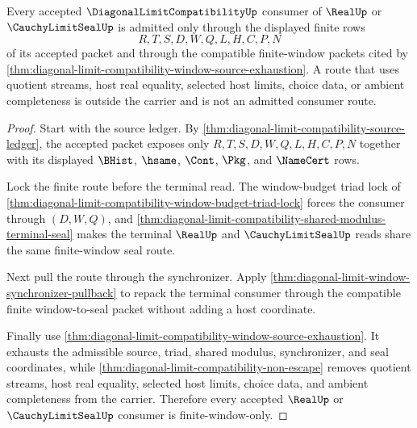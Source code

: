 \begin{theorem}
\label{thm:diagonal-limit-compatibility-finite-window-only-consumer}
Every accepted $\DiagonalLimitCompatibilityUp$ consumer of $\RealUp$ or
$\CauchyLimitSealUp$ is admitted only through the displayed finite rows
$$
R,T,S,D,W,Q,L,H,C,P,N
$$
of its accepted packet and through the compatible finite-window packets cited by
\autoref{thm:diagonal-limit-compatibility-window-source-exhaustion}. A route
that uses quotient streams, host real equality, selected host limits, choice
data, or ambient completeness is outside the carrier and is not an admitted
consumer route.
\end{theorem}
\begin{proof}
Start with the source ledger. By
\autoref{thm:diagonal-limit-compatibility-source-ledger}, the accepted packet
exposes only $R,T,S,D,W,Q,L,H,C,P,N$ together with its displayed $\BHist$,
$\hsame$, $\Cont$, $\Pkg$, and $\NameCert$ rows.

Lock the finite route before the terminal read. The window-budget triad lock of
\autoref{thm:diagonal-limit-compatibility-window-budget-triad-lock} forces the
consumer through $(D,W,Q)$, and
\autoref{thm:diagonal-limit-compatibility-shared-modulus-terminal-seal} makes
the terminal $\RealUp$ and $\CauchyLimitSealUp$ reads share the same
finite-window seal route.

Next pull the route through the synchronizer. Apply
\autoref{thm:diagonal-limit-window-synchronizer-pullback} to repack the
terminal consumer through the compatible finite window-to-seal packet without
adding a host coordinate.

Finally use
\autoref{thm:diagonal-limit-compatibility-window-source-exhaustion}. It
exhausts the admissible source, triad, shared modulus, synchronizer, and seal
coordinates, while \autoref{thm:diagonal-limit-compatibility-non-escape}
removes quotient streams, host real equality, selected host limits, choice
data, and ambient completeness from the carrier. Therefore every accepted
$\RealUp$ or $\CauchyLimitSealUp$ consumer is finite-window-only.
\end{proof}
